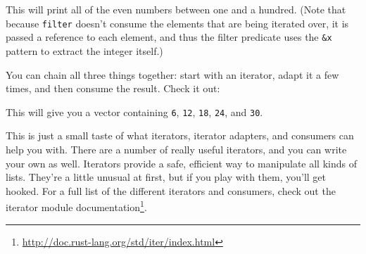 \documentclass[a4paper,]{book}
\newenvironment{Shaded}{\begin{snugshade}}{\end{snugshade}}
\newcommand{\KeywordTok}[1]{\textcolor[rgb]{0.13,0.29,0.53}{\textbf{{#1}}}}
\newcommand{\DataTypeTok}[1]{\textcolor[rgb]{0.13,0.29,0.53}{{#1}}}
\newcommand{\DecValTok}[1]{\textcolor[rgb]{0.00,0.00,0.81}{{#1}}}
\newcommand{\StringTok}[1]{\textcolor[rgb]{0.31,0.60,0.02}{{#1}}}
\newcommand{\PreprocessorTok}[1]{\textcolor[rgb]{0.56,0.35,0.01}{\textit{{#1}}}}
\newcommand{\NormalTok}[1]{{#1}}
\renewcommand{\href}[2]{#2\footnote{\url{#1}}}
\begin{document}
\begin{Shaded}
\end{Shaded}

This will print all of the even numbers between one and a hundred. (Note
that because \texttt{filter} doesn't consume the elements that are being
iterated over, it is passed a reference to each element, and thus the
filter predicate uses the \texttt{\&x} pattern to extract the integer
itself.)

You can chain all three things together: start with an iterator, adapt
it a few times, and then consume the result. Check it out:

\begin{Shaded}
\end{Shaded}

This will give you a vector containing \texttt{6}, \texttt{12},
\texttt{18}, \texttt{24}, and \texttt{30}.

This is just a small taste of what iterators, iterator adapters, and
consumers can help you with. There are a number of really useful
iterators, and you can write your own as well. Iterators provide a safe,
efficient way to manipulate all kinds of lists. They're a little unusual
at first, but if you play with them, you'll get hooked. For a full list
of the different iterators and consumers, check out the
\href{http://doc.rust-lang.org/std/iter/index.html}{iterator module
documentation}.

\end{document}
